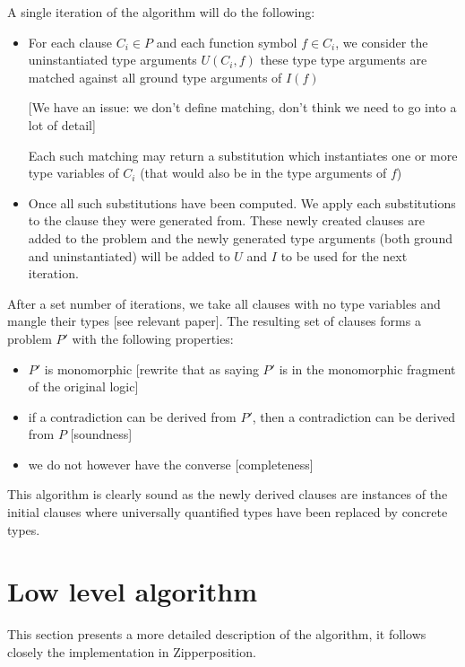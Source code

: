 \documentclass[]{ceurart}
\begin{document}
A single iteration of the algorithm will do the following:
\begin{itemize}
   \item For each clause \(C_i \in P\) and each function symbol \(f \in C_i\), we consider the uninstantiated type arguments \(U(C_i, f)\) these type type arguments are matched against all ground type arguments of \(I(f)\)

      [We have an issue: we don't define matching, don't think we need to go into a lot of detail]

      Each such matching may return a substitution which instantiates one or more type variables of \(C_i\) (that would also be in the type arguments of \(f\))

   \item Once all such substitutions have been computed. We apply each substitutions to the clause they were generated from. These newly created clauses are added to the problem and the newly generated type arguments (both ground and uninstantiated) will be added to \(U\) and \(I\) to be used for the next iteration.
\end{itemize}

After a set number of iterations, we take all clauses with no type variables and mangle their types [see relevant paper]. The resulting set of clauses forms a problem \(P'\) with the following properties:
\begin{itemize}
   \item \(P'\) is monomorphic [rewrite that as saying \(P'\) is in the monomorphic fragment of the original logic]
   \item if a contradiction can be derived from \(P'\), then a contradiction can be derived from \(P\) [soundness]
   \item we do not however have the converse [completeness]
\end{itemize}


This algorithm is clearly sound as the newly derived clauses are instances of the initial clauses where universally quantified types have been replaced by concrete types.

\section{Low level algorithm}
\label{sec:low-level-algorithm}

This section presents a more detailed description of the algorithm, it follows closely the implementation in Zipperposition.
\end{document}
